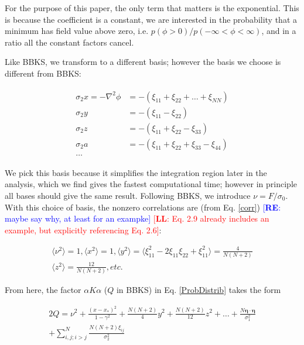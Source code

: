 \documentclass[12pt]{article}
\newcommand{\re}[1]{\textcolor{blue}{[{\bf RE}: #1]}}
\newcommand{\lfl}[1]{\textcolor{red}{[{\bf LL}: #1]}}
\begin{document}
For the purpose of this paper, the only term that matters is the exponential. This is because the coefficient is a constant, we are interested in the probability that a minimum has field value above zero, i.e. $p(\phi>0)/p(-\infty<\phi<\infty)$, and in a ratio all the constant factors cancel.

Like BBKS, we transform to a different basis; however the basis we choose is different from BBKS:

\begin{align*}
\begin{split}
\sigma_2x = -\nabla^2\phi &= -(\xi_{11}+\xi_{22}+\ldots+\xi_{NN})\\
\sigma_2y &= -(\xi_{11}-\xi_{22})\\
\sigma_2z &= -(\xi_{11}+\xi_{22}-\xi_{33})\\
\sigma_2a &= -(\xi_{11}+\xi_{22}+\xi_{33}-\xi_{44})\\
\ldots
\end{split}
\end{align*}

We pick this basis because it simplifies the integration region later in the analysis, which we find gives the fastest computational time; however in principle all bases should give the same result. Following BBKS, we introduce $\nu = F/\sigma_0$. With this choice of basis, the nonzero correlations are (from Eq. \ref{corr}) \re{maybe say why, at least for an exampke} \lfl{Eq. 2.9 already includes an example, but explicitly referencing Eq. 2.6}:

\begin{gather}
\langle\nu^2\rangle = 1, \langle x^2\rangle=1, \langle y^2 \rangle = \langle \xi_{11}^2 -2\xi_{11}\xi_{22} + \xi_{11}^2\rangle = \frac{4}{N(N+2)} \\
\langle z^2 \rangle = \frac{12}{N(N+2)}, etc.
\end{gather}

From here, the factor $\alpha K \alpha$ ($Q$ in BBKS) in Eq. \ref{ProbDistrib} takes the form

\begin{equation} \label{Q}
\begin{split}
2Q = \nu^2 + \frac{(x-x_*)^2}{1-\gamma^2} + \frac{N(N+2)}{4}y^2 + \frac{N(N+2)}{12}z^2 + \ldots + \frac{N \pmb{\eta}\cdot \pmb{\eta}}{\sigma_1^2} \\
+ \sum_{i,j;i > j}^N\frac{N(N+2)\xi_{ij}}{\sigma_2^2}
\end{split}
\end{equation}
\end{document}
